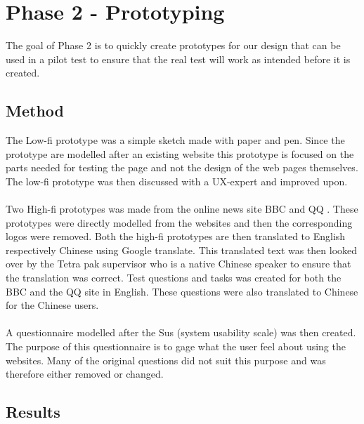 
\chapter{Phase 2 - Prototyping} %

\label{Chapter5} %

The goal of Phase 2 is to quickly create prototypes for our design that can be used in a pilot test to ensure that the real test will work as intended before it is created. 

\section{Method}
The Low-fi prototype was a simple sketch made with paper and pen. Since the prototype are modelled after an existing website this prototype is focused on the parts needed for testing the page and not the design of the web pages themselves. The low-fi prototype was then discussed with a UX-expert and improved upon.
\\\\
Two High-fi prototypes was made from the online news site BBC \cite{bbc} and QQ \cite{qq_homepage}. These prototypes were directly modelled from the websites and then the corresponding logos were removed. Both the high-fi prototypes are then translated to English respectively Chinese using Google translate. This translated text was then looked over by the Tetra pak supervisor who is a native Chinese speaker to ensure that the translation was correct. Test questions and tasks was created for both the BBC and the QQ site in English. These questions were also translated to Chinese for the Chinese users.
\\\\
A questionnaire modelled after the Sus (system usability scale) was then created. The purpose of this questionnaire is to gage what the user feel about using the websites. Many of the original questions did not suit this purpose and was therefore either removed or changed.

\section{Results}
